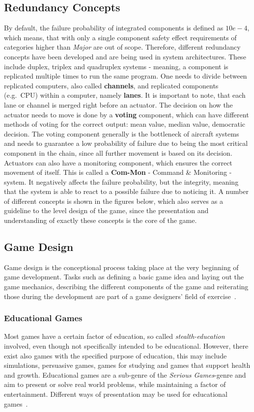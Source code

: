 \subsection{Redundancy Concepts}\label{subsec:redundancy-concepts}
By default, the failure probability of integrated components is defined as $10e-4$, which means, that with only a single component
safety effect requirements of categories higher than \textit{Major} are out of scope.
Therefore, different redundancy concepts have been developed and are being used in system architectures.
These include duplex, triplex and quadruplex systems - meaning, a component is replicated multiple times to run the same program.
One needs to divide between replicated computers, also called \textbf{channels}, and replicated components (e.g.\ CPU) within a computer,
namely \textbf{lanes}.
It is important to note, that each lane or channel is merged right before an actuator.
The decision on how the actuator needs to move is done by a \textbf{voting} component, which can have different methods of voting
for the correct output: mean value, median value, democratic decision.
The voting component generally is the bottleneck of aircraft systems and needs to guarantee a low probability of failure
due to being the most critical component in the chain, since all further movement is based on its decision.
Actuators can also have a monitoring component, which ensures the correct movement of itself.
This is called a \textbf{Com-Mon} - Command \& Monitoring - system.
It negatively affects the failure probability, but the integrity, meaning that the system is able to react to a possible failure due
to noticing it.
A number of different concepts is shown in the figures below, which also serves as a guideline to the level design of the game,
since the presentation and understanding of exactly these concepts is the core of the game.
\subsection{Game Design}\label{subsec:game-design}
Game design is the conceptional process taking place at the very beginning of game development.
Tasks such as defining a basic game idea and laying out the game mechanics, describing the different components of the game and
reiterating those during the development are part of a game designers' field of exercise~\cite{10.5555/2544002}.
\subsubsection{Educational Games}\label{subsubsec:educational-games}
Most games have a certain factor of education, so called \textit{stealth-education} involved, even though not
specifically intended to be educational.
However, there exist also games with the specified purpose of education, this may include simulations, persuasive games,
games for studying and games that support health and growth.
Educational games are a sub-genre of the \textit{Serious Games}-genre and aim to present or solve real world problems,
while maintaining a factor of entertainment.
Different ways of presentation may be used for educational games~\cite[p.43]{10.5555/2544002}.

